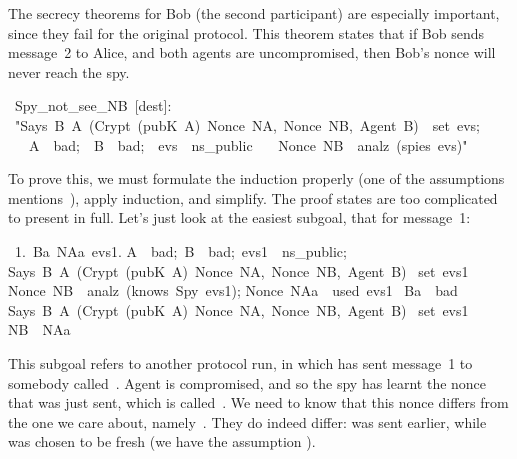 The secrecy theorems for Bob (the second participant) are especially
important, since they fail for the original protocol.  This theorem states
that if Bob sends message~2 to Alice, and both agents are uncompromised,
then Bob's nonce will never reach the spy.
\begin{isabelle}
\ Spy_not_see_NB\ [dest]:\isanewline
\ "\isasymlbrakk Says\ B\ A\ (Crypt\ (pubK\ A)\ \isasymlbrace Nonce\ NA,\ Nonce\ NB,\ Agent\ B\isasymrbrace )\ \isasymin \ set\ evs;\isanewline
\ \ \ A\ \isasymnotin \ bad;\ \ B\ \isasymnotin \ bad;\ \ evs\ \isasymin \ ns_public\isasymrbrakk \isanewline
\ \ \isasymLongrightarrow \ Nonce\ NB\ \isasymnotin \ analz\ (spies\ evs)"
\end{isabelle}
%
To prove this, we must formulate the induction properly (one of the
assumptions mentions~), apply induction, and simplify.
The proof states are too complicated to present in full.  
Let's just look
at the easiest subgoal, that for message~1:
\begin{isabelle}
\ 1.\ \isasymAnd Ba\ NAa\ evs1.\isanewline
{}\isasymlbrakk A\ \isasymnotin \ bad;\ B\ \isasymnotin \ bad;\ evs1\ \isasymin \ ns_public;\isanewline
{}Says\ B\ A\ (Crypt\ (pubK\ A)\ \isasymlbrace Nonce\ NA,\ Nonce\ NB,\ Agent\ B\isasymrbrace )\isanewline
{}\isasymin \ set\ evs1\ \isasymlongrightarrow \isanewline
{}Nonce\ NB\ \isasymnotin \ analz\ (knows\ Spy\ evs1);\isanewline
{}Nonce\ NAa\ \isasymnotin \ used\ evs1\isasymrbrakk \isanewline
{}\isasymLongrightarrow \ Ba\ \isasymin \ bad\ \isasymlongrightarrow \isanewline
{}Says\ B\ A\ (Crypt\ (pubK\ A)\ \isasymlbrace Nonce\ NA,\ Nonce\ NB,\ Agent\ B\isasymrbrace )\isanewline
{}\isasymin \ set\ evs1\ \isasymlongrightarrow \isanewline
{}NB\ \isasymnoteq \ NAa
\end{isabelle}
This subgoal refers to another protocol run, in which  has sent
message~1 to somebody called~.  Agent  
is compromised, and so the spy has learnt the nonce that was just sent,
which is called~.  We need to know that this nonce differs from the
one we care about, namely~\@.  They do indeed differ:  was
sent earlier, while  was chosen to be fresh (we have the assumption
). 

